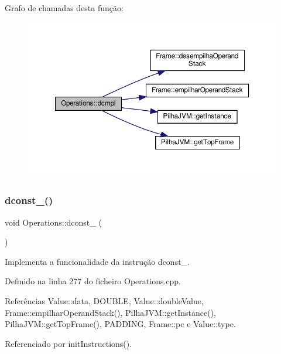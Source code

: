 Grafo de chamadas desta função\+:
\nopagebreak
\begin{figure}[H]
\begin{center}
\leavevmode
\includegraphics[width=350pt]{classOperations_a89e1792d8c650c2274352c534cfbd7c0_cgraph}
\end{center}
\end{figure}
\mbox{\label{classOperations_abd7f711342c43f7fa4e93b41931e6c86}} 
\subsubsection{\texorpdfstring{dconst\+\_()}{dconst\_0()}}
{\footnotesize\ttfamily void Operations\+::dconst\+\_ (\begin{DoxyParamCaption}{ }\end{DoxyParamCaption})\hspace{0.3cm}{\ttfamily [private]}}



Implementa a funcionalidade da instrução dconst\+\_. 



Definido na linha 277 do ficheiro Operations.\+cpp.



Referências Value\+::data, D\+O\+U\+B\+LE, Value\+::double\+Value, Frame\+::empilhar\+Operand\+Stack(), Pilha\+J\+V\+M\+::get\+Instance(), Pilha\+J\+V\+M\+::get\+Top\+Frame(), P\+A\+D\+D\+I\+NG, Frame\+::pc e Value\+::type.



Referenciado por init\+Instructions().

